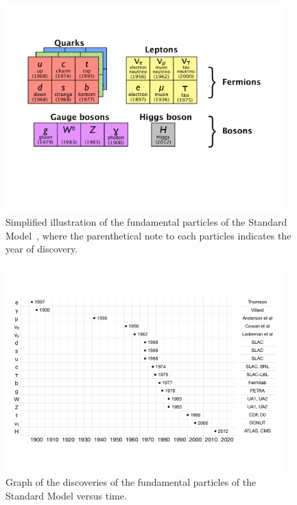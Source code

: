 \begin{figure}[tp]
  \centering
  \includegraphics[width=0.95\textwidth]{figures/standardmodel/sm-content}
  \caption{Simplified illustration of the fundamental particles of the Standard Model~\cite{2013.thesis.ryan}, where the parenthetical note to each particles indicates the year of discovery.}
  \label{fig:sm-particles-1}
\end{figure}

\begin{figure}[tp]
  \centering
  \includegraphics[width=0.95\textwidth]{figures/standardmodel/discoveries}
  \caption{Graph of the discoveries of the fundamental particles of the Standard Model versus time.}
  \label{fig:sm-particles-2}
\end{figure}

